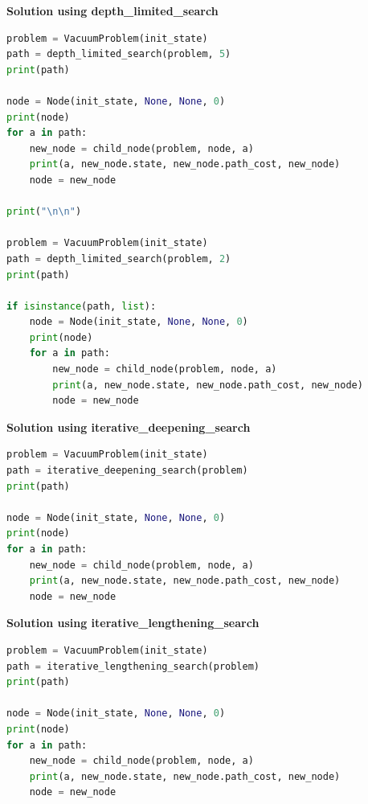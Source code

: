 {\centering \textbf{Solution using depth\_limited\_search} \par}

\begin{lstlisting}[language=Python]
problem = VacuumProblem(init_state)
path = depth_limited_search(problem, 5)
print(path)

node = Node(init_state, None, None, 0)
print(node)
for a in path:
    new_node = child_node(problem, node, a)
    print(a, new_node.state, new_node.path_cost, new_node)
    node = new_node

print("\n\n")

problem = VacuumProblem(init_state)
path = depth_limited_search(problem, 2)
print(path)

if isinstance(path, list):
    node = Node(init_state, None, None, 0)
    print(node)
    for a in path:
        new_node = child_node(problem, node, a)
        print(a, new_node.state, new_node.path_cost, new_node)
        node = new_node
\end{lstlisting}



{\centering \textbf{Solution using iterative\_deepening\_search} \par}

\begin{lstlisting}[language=Python]
problem = VacuumProblem(init_state)
path = iterative_deepening_search(problem)
print(path)

node = Node(init_state, None, None, 0)
print(node)
for a in path:
    new_node = child_node(problem, node, a)
    print(a, new_node.state, new_node.path_cost, new_node)
    node = new_node
\end{lstlisting}



{\centering \textbf{Solution using iterative\_lengthening\_search} \par}

\begin{lstlisting}[language=Python]
problem = VacuumProblem(init_state)
path = iterative_lengthening_search(problem)
print(path)

node = Node(init_state, None, None, 0)
print(node)
for a in path:
    new_node = child_node(problem, node, a)
    print(a, new_node.state, new_node.path_cost, new_node)
    node = new_node
\end{lstlisting}


